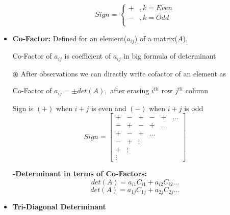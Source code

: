 \documentclass[a4paper,11pt]{article}
\numberwithin{equation}{section}
\begin{document}
\begin{itemize}
\begin{equation}
    Sign=
        \begin{cases}
        + & ,k=Even\\
        - & ,k=Odd\\ 
        \end{cases}
\end{equation}


\item \textbf{Co-Factor: }Defined for an element($a_{ij}$) of a matrix($A$).
\begin{center}
    Co-Factor of $a_{ij}$ is coefficient of $a_{ij}$ in big formula of determinant
\end{center}

$\circledast$ After observations we can directly write cofactor of an element as
\begin{center}
    Co-Factor of $a_{ij}=\pm det(A),$ after erasing $i^{th}$ row $j^{th}$ column
\end{center}
Sign is $(+)$ when $i+j$ is even and $(-)$ when $i+j$ is odd
\begin{equation}
    Sign=\begin{bmatrix}
        +&-&+&-&+&\dots\\
        -&+&-&+&\dots\\
        +&-&+&\dots\\
        -&+&\vdots\\
        +&\vdots\\
        \vdots
    \end{bmatrix}
\end{equation}

\textbf{-Determinant in terms of Co-Factors: } 
\begin{equation}
    det(A)=a_{i1}C_{i1}+a_{i2}C_{i2}\dots \tag{Row Wise}
\end{equation}
\begin{equation}
    det(A)=a_{1j}C_{1j}+a_{2j}C_{2j}\dots \tag{Col Wise}
\end{equation}

\item \textbf{Tri-Diagonal Determinant}


\end{itemize}
\end{document}
